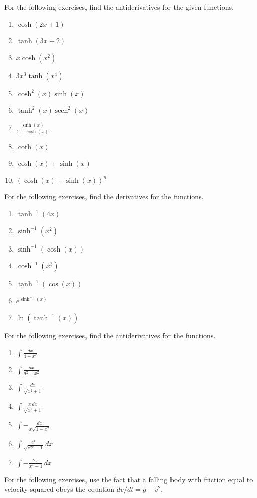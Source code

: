\documentclass{exercises}
\begin{document}
For the following exercises, find the antiderivatives for the given functions.

\begin{enumerate}[resume]
\item $\cosh(2x+1)$
\item $\tanh(3x+2)$
\item $x\cosh(x^{2})$
\item $3x^{3}\tanh(x^{4})$
\item $\cosh^{2}(x)\sinh(x)$
\item $\tanh^{2}(x)\operatorname{sech}^{2}(x)$
\item $\frac{\sinh(x)}{1+\cosh(x)}$
\item $\coth(x)$
\item $\cosh(x)+\sinh(x)$
\item $(\cosh(x)+\sinh(x))^{n}$
\end{enumerate}

For the following exercises, find the derivatives for the functions.

\begin{enumerate}[resume]
\item $\tanh^{-1}(4x)$
\item $\sinh^{-1}(x^{2})$
\item $\sinh^{-1}(\cosh(x))$
\item $\cosh^{-1}(x^{3})$
\item $\tanh^{-1}(\cos(x))$
\item $e^{\sinh^{-1}(x)}$
\item $\ln(\tanh^{-1}(x))$
\end{enumerate}

For the following exercises, find the antiderivatives for the functions.

\begin{enumerate}[resume]
\item $\int \frac{dx}{4-x^{2}}$
\item $\int \frac{dx}{a^{2}-x^{2}}$
\item $\int \frac{dx}{\sqrt{x^{2}+1}}$
\item $\int \frac{x\,dx}{\sqrt{x^{2}+1}}$
\item $\int-\frac{dx}{x\sqrt{1-x^{2}}}$
\item $\int \frac{e^{x}}{\sqrt{e^{2x}-1}}\,dx$
\item $\int-\frac{2x}{x^{4}-1}\,dx$
\end{enumerate}

For the following exercises, use the fact that a falling body with friction equal to velocity squared obeys the equation $dv/dt=g-v^{2}$.
\end{document}
